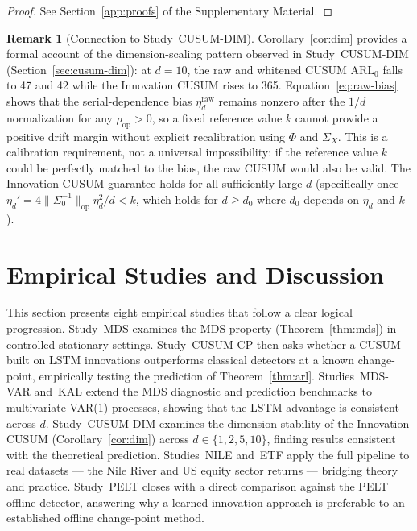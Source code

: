\documentclass[bj,authoryear]{imsart}
\theoremstyle{plain}
\theoremstyle{definition}
\newtheorem{remark}[theorem]{Remark}
\begin{document}
\begin{proof}
  See Section~\ref{app:proofs} of the Supplementary Material.
\end{proof}

\begin{remark}[Connection to Study~CUSUM-DIM]
  Corollary~\ref{cor:dim} provides a formal account of the
  dimension-scaling pattern observed in Study~CUSUM-DIM
  (Section~\ref{sec:cusum-dim}): at $d=10$, the raw and whitened CUSUM
  ARL$_0$ falls to 47 and 42 while the Innovation CUSUM rises to 365.
  Equation~\eqref{eq:raw-bias} shows that the serial-dependence bias
  $\eta_d^{\mathrm{raw}}$ remains nonzero after the $1/d$ normalization
  for any $\rho_{\mathrm{op}}>0$, so a fixed reference value $k$ cannot
  provide a positive drift margin without explicit recalibration using
  $\Phi$ and $\Sigma_X$.  This is a calibration requirement, not a
  universal impossibility: if the reference value $k$ could be perfectly
  matched to the bias, the raw CUSUM would also be valid.
  The Innovation CUSUM guarantee holds for all sufficiently large $d$
  (specifically once $\eta_d'=4\|\Sigma_0^{-1}\|_{\mathrm{op}}\eta_d^2/d<k$,
  which holds for $d\geq d_0$ where $d_0$ depends on $\eta_d$ and $k$).
\end{remark}

\section{Empirical Studies and Discussion}
\label{sec:empirical}

This section presents eight empirical studies that follow a clear logical
progression.  Study~MDS examines the MDS property (Theorem~\ref{thm:mds})
in controlled stationary settings.  Study~CUSUM-CP then asks whether a CUSUM built
on LSTM innovations outperforms classical detectors at a known change-point,
empirically testing the prediction of Theorem~\ref{thm:arl}.
Studies~MDS-VAR and~KAL extend the MDS diagnostic and prediction benchmarks to
multivariate VAR(1) processes, showing that the LSTM advantage is consistent
across $d$.  Study~CUSUM-DIM examines the dimension-stability of the Innovation CUSUM
(Corollary~\ref{cor:dim}) across $d \in \{1,2,5,10\}$, finding results
consistent with the theoretical prediction.
Studies~NILE and~ETF apply the full pipeline to real datasets — the Nile River
and US equity sector returns — bridging theory and practice.
Study~PELT closes with a direct comparison against the PELT offline detector,
answering why a learned-innovation approach is preferable to an
established offline change-point method.
\end{document}
